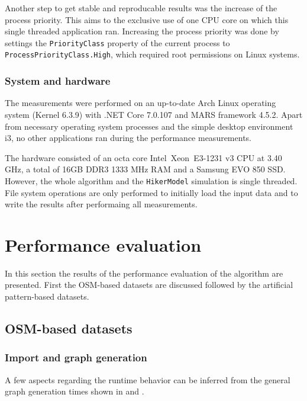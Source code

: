 			Another step to get stable and reproducable results was the increase of the process priority.
			This aims to the exclusive use of one CPU core on which this single threaded application ran.
			Increasing the process priority was done by settings the \texttt{PriorityClass} property of the current process to \texttt{ProcessPriorityClass.High}, which required root permissions on Linux systems.
		
		\subsubsection{System and hardware}
		
			The measurements were performed on an up-to-date Arch Linux operating system (Kernel 6.3.9) with .NET Core 7.0.107 and MARS framework 4.5.2.
			Apart from necessary operating system processes and the simple desktop environment i3, no other applications ran during the performance measurements.
			
			The hardware consisted of an octa core Intel\textregistered\ Xeon\textregistered\ E3-1231 v3 CPU at 3.40 GHz, a total of 16GB DDR3 1333 MHz RAM and a Samsung EVO 850 SSD.
			However, the whole algorithm and the \texttt{HikerModel} simulation is single threaded.
			File system operations are only performed to initially load the input data and to write the results after performaing all measurements.
	
\section{Performance evaluation}

	In this section the results of the performance evaluation of the algorithm are presented.
	First the OSM-based datasets are discussed followed by the artificial pattern-based datasets.

	\subsection{OSM-based datasets}
		
		\subsubsection{Import and graph generation}
		
			A few aspects regarding the runtime behavior can be inferred from the general graph generation times shown in  and .
			
